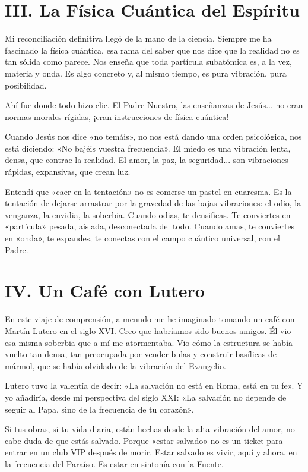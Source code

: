 \documentclass[12pt,twoside,openany]{book}
\begin{document}
\section*{III. La Física Cuántica del Espíritu}

Mi reconciliación definitiva llegó de la mano de la ciencia. Siempre me ha fascinado la física cuántica, esa rama del saber que nos dice que la realidad no es tan sólida como parece. Nos enseña que toda partícula subatómica es, a la vez, materia y onda. Es algo concreto y, al mismo tiempo, es pura vibración, pura posibilidad.

Ahí fue donde todo hizo clic. El Padre Nuestro, las enseñanzas de Jesús... no eran normas morales rígidas, ¡eran instrucciones de física cuántica!

Cuando Jesús nos dice «no temáis», no nos está dando una orden psicológica, nos está diciendo: «No bajéis vuestra frecuencia». El miedo es una vibración lenta, densa, que contrae la realidad. El amor, la paz, la seguridad... son vibraciones rápidas, expansivas, que crean luz.

Entendí que «caer en la tentación» no es comerse un pastel en cuaresma. Es la tentación de dejarse arrastrar por la gravedad de las bajas vibraciones: el odio, la venganza, la envidia, la soberbia. Cuando odias, te densificas. Te conviertes en «partícula» pesada, aislada, desconectada del todo. Cuando amas, te conviertes en «onda», te expandes, te conectas con el campo cuántico universal, con el Padre.

\section*{IV. Un Café con Lutero}

En este viaje de comprensión, a menudo me he imaginado tomando un café con Martín Lutero en el siglo XVI. Creo que habríamos sido buenos amigos. Él vio esa misma soberbia que a mí me atormentaba. Vio cómo la estructura se había vuelto tan densa, tan preocupada por vender bulas y construir basílicas de mármol, que se había olvidado de la vibración del Evangelio.

Lutero tuvo la valentía de decir: «La salvación no está en Roma, está en tu fe». Y yo añadiría, desde mi perspectiva del siglo XXI: «La salvación no depende de seguir al Papa, sino de la frecuencia de tu corazón».

Si tus obras, si tu vida diaria, están hechas desde la alta vibración del amor, no cabe duda de que estás salvado. Porque «estar salvado» no es un ticket para entrar en un club VIP después de morir. Estar salvado es vivir, aquí y ahora, en la frecuencia del Paraíso. Es estar en sintonía con la Fuente.
\end{document}
